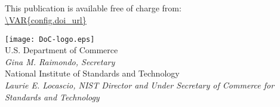 \begin{titlepage}
\begin{flushright}
\normalsize {}\\
\textit{}\\
\textit{}\\
\textit{}\\
\vfill
\vfill
\normalsize This publication is available free of charge from:\\
\url{\VAR{config.doi_url}}\\
\vfill
\normalsize {}
\vfill

\texttt{[image: DoC-logo.eps]}\\ 
\vfill
\footnotesize U.S. Department of Commerce\\ 
\textit{Gina M. Raimondo, Secretary}\\
\vspace{10pt}
National Institute of Standards and Technology\\ 
\hspace*{-3cm}\textit{Laurie E. Locascio, NIST Director and Under Secretary of Commerce for Standards and Technology}  
\end{flushright}
\end{titlepage}



